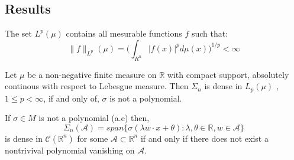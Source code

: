 \documentclass[../main.tex]{subfiles}
\begin{document}
\subsection{Results}


\begin{definition} The set $L^{p}(\mu)$ contains all mesurable functions $f$ such that: 
	$$ \|f\|_{L^p}(\mu) = \Big( \int_{R^n} |f(x)|^p d\mu(x)\Big)^{1/p} < \infty $$

\end{definition}

\begin{propo}
Let $\mu $ be a non-negative finite measure on $\mathbb{R}$ with compact support, absolutely continous with respect to Lebesgue measure. Then $\Sigma_n$ is dense in $L_p(\mu)$ , $1\leq p < \infty$, if and only of, $\sigma$ is not a polynomial.
\end{propo}

\begin{propo}
If $\sigma\in M$ is not a polynomial (a.e) then, $$ \Sigma_n(\mathcal{A})= span \{ \sigma(\lambda w \cdot x + \theta) : \lambda, \theta \in \mathbb{R}, w \in \mathcal{A} \}$$
is dense in $\mathcal{C}(\mathbb{R}^n)$ for some $\mathcal{A}\subset \mathbb{R}^n$ if and only if there does not exist a nontrivival polynomial vanishing on $\mathcal{A}$.
\end{propo}
\end{document}
